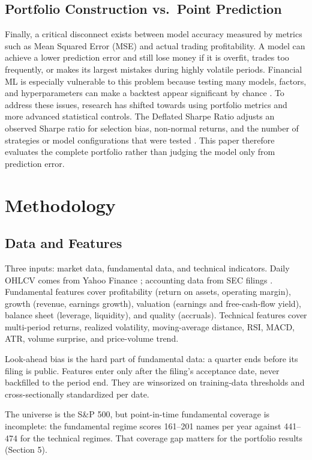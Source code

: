 \documentclass[11pt,twocolumn]{article}
\begin{document}
\subsection{Portfolio Construction vs.\ Point Prediction}

Finally, a critical disconnect exists between model accuracy measured by
metrics such as Mean Squared Error (MSE) and actual trading
profitability. A model can achieve a lower prediction error and still
lose money if it is overfit, trades too frequently, or makes its largest
mistakes during highly volatile periods. Financial ML is especially
vulnerable to this problem because testing many models, factors, and
hyperparameters can make a backtest appear significant by chance
\cite{harvey2016}. To address these issues, research has shifted towards
using portfolio metrics and more advanced statistical controls. The
Deflated Sharpe Ratio adjusts an observed Sharpe ratio for selection
bias, non-normal returns, and the number of strategies or model
configurations that were tested \cite{bailey2014}. This paper therefore
evaluates the complete portfolio rather than judging the model only from
prediction error.

\section{Methodology}

\subsection{Data and Features}

Three inputs: market data, fundamental data, and technical indicators.
Daily OHLCV comes from Yahoo Finance \cite{yahoo2026}; accounting data
from SEC filings \cite{sec2025}. Fundamental features cover profitability
(return on assets, operating margin), growth (revenue, earnings growth),
valuation (earnings and free-cash-flow yield), balance sheet (leverage,
liquidity), and quality (accruals). Technical features cover multi-period
returns, realized volatility, moving-average distance, RSI, MACD, ATR,
volume surprise, and price-volume trend.

Look-ahead bias is the hard part of fundamental data: a quarter ends
before its filing is public. Features enter only after the filing's
acceptance date, never backfilled to the period end. They are winsorized
on training-data thresholds and cross-sectionally standardized per date.

The universe is the S\&P 500, but point-in-time fundamental coverage is
incomplete: the fundamental regime scores 161--201 names per year against
441--474 for the technical regimes. That coverage gap matters for the
portfolio results (Section 5).
\end{document}
